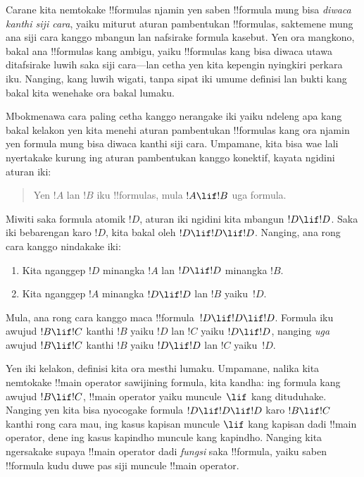 \documentclass[../../../include/open-logic-section]{subfiles}
\begin{document}


\begin{explain}
Carane kita nemtokake !!{formula}s njamin yen saben !!{formula} mung
bisa \emph{diwaca kanthi siji cara}, yaiku miturut aturan pambentukan
!!{formula}s, saktemene mung ana siji cara kanggo mbangun lan
nafsirake formula kasebut. Yen ora mangkono, bakal ana !!{formula}s
kang ambigu, yaiku !!{formula}s kang bisa diwaca utawa ditafsirake
luwih saka siji cara---lan cetha yen kita kepengin nyingkiri perkara
iku. Nanging, kang luwih wigati, tanpa sipat iki umume definisi lan
bukti kang bakal kita wenehake ora bakal lumaku.

Mbokmenawa cara paling cetha kanggo nerangake iki yaiku ndeleng apa
kang bakal kelakon yen kita menehi aturan pambentukan !!{formula}s
kang ora njamin yen formula mung bisa diwaca kanthi siji cara.
Umpamane, kita bisa wae lali nyertakake kurung ing aturan pambentukan
kanggo konektif, kayata ngidini aturan iki:
\begin{quote}
Yen $!A$ lan $!B$ iku !!{formula}s, mula $!A \lif !B$ uga formula.
\end{quote}
Miwiti saka formula atomik $!D$, aturan iki ngidini kita mbangun
$!D \lif !D$. Saka iki bebarengan karo $!D$, kita bakal oleh $!D \lif !D
\lif !D$. Nanging, ana rong cara kanggo nindakake iki:
\begin{enumerate}
\item Kita nganggep $!D$ minangka $!A$ lan $!D \lif !D$ minangka $!B$.
\item Kita nganggep $!A$ minangka $!D \lif !D$ lan $!B$ yaiku~$!D$.
\end{enumerate}
Mula, ana rong cara kanggo maca !!{formula}~$!D \lif !D \lif !D$.
Formula iku awujud $!B \lif !C$ kanthi $!B$ yaiku $!D$ lan $!C$
yaiku $!D \lif !D$, nanging \emph{uga} awujud $!B \lif !C$ kanthi
$!B$ yaiku $!D \lif !D$ lan $!C$ yaiku~$!D$.

Yen iki kelakon, definisi kita ora mesthi lumaku. Umpamane, nalika
kita nemtokake !!{main operator} sawijining formula, kita kandha:
ing formula kang awujud $!B \lif !C$, !!{main operator} yaiku
muncule~$\lif$ kang dituduhake. Nanging yen kita bisa nyocogake
formula $!D \lif !D \lif !D$ karo $!B \lif !C$ kanthi rong cara mau,
ing kasus kapisan muncule $\lif$ kang kapisan dadi !!{main operator},
dene ing kasus kapindho muncule kang kapindho. Nanging kita
ngersakake supaya !!{main operator} dadi \emph{fungsi} saka
!!{formula}, yaiku saben !!{formula} kudu duwe pas siji muncule
!!{main
  operator}.
\end{explain}
\end{document}
